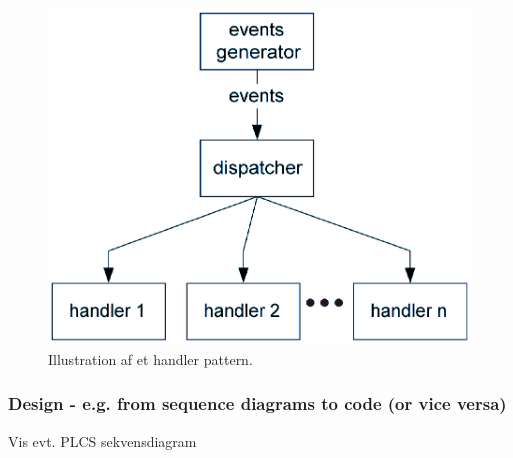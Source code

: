 \begin{figure}[h]
	\centering
	\includegraphics[width=0.6\linewidth]{figs/spm3/handlersPattern}
	\caption{Illustration af et handler pattern.}
	\label{fig:handlPat}
\end{figure}

\subsubsection{Design - e.g. from sequence diagrams to code (or vice versa)}
Vis evt. PLCS sekvensdiagram